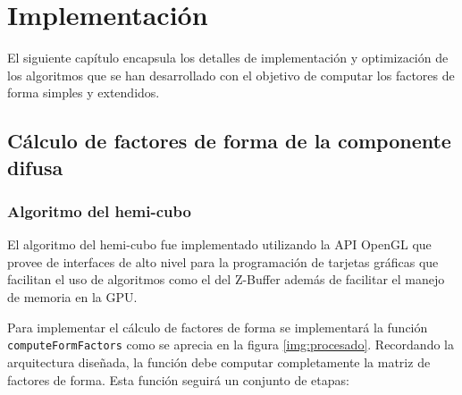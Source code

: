 \chapter{Implementación}
\label{ch:chap04}

El siguiente capítulo encapsula los detalles de implementación y optimización de los algoritmos que se han desarrollado con el objetivo de computar los factores de forma simples y extendidos.

\section{Cálculo de factores de forma de la componente difusa}
\label{sec:dif-impl}

\subsection{Algoritmo del hemi-cubo}

El algoritmo del hemi-cubo fue implementado utilizando la API OpenGL que provee de interfaces de alto nivel para la programación de tarjetas gráficas que facilitan el uso de algoritmos como el del Z-Buffer además de facilitar el manejo de memoria en la GPU.

Para implementar el cálculo de factores de forma se implementará la función \verb|computeFormFactors| como se aprecia en la figura \ref{img:procesado}. Recordando la arquitectura diseñada, la función debe computar completamente la matriz de factores de forma. Esta función seguirá un conjunto de etapas:


